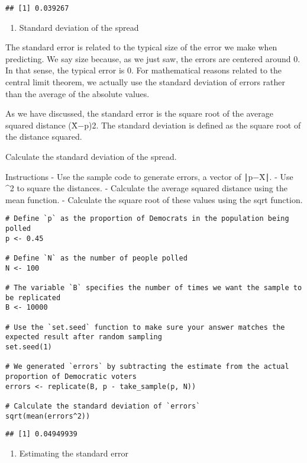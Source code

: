 \documentclass[
]{article}
\providecommand{\tightlist}{%
  \setlength{\itemsep}{0pt}\setlength{\parskip}{0pt}}
\begin{document}
\begin{verbatim}
## [1] 0.039267
\end{verbatim}

\begin{enumerate}
\def\labelenumi{\arabic{enumi}.}
\setcounter{enumi}{4}
\tightlist
\item
  Standard deviation of the spread
\end{enumerate}

The standard error is related to the typical size of the error we make
when predicting. We say size because, as we just saw, the errors are
centered around 0. In that sense, the typical error is 0. For
mathematical reasons related to the central limit theorem, we actually
use the standard deviation of errors rather than the average of the
absolute values.

As we have discussed, the standard error is the square root of the
average squared distance (X̄−p)2. The standard deviation is defined as
the square root of the distance squared.

Calculate the standard deviation of the spread.

Instructions - Use the sample code to generate errors, a vector of
∣p−X̄∣. - Use \^{}2 to square the distances. - Calculate the average
squared distance using the mean function. - Calculate the square root of
these values using the sqrt function.

\begin{verbatim}
# Define `p` as the proportion of Democrats in the population being polled
p <- 0.45

# Define `N` as the number of people polled
N <- 100

# The variable `B` specifies the number of times we want the sample to be replicated
B <- 10000

# Use the `set.seed` function to make sure your answer matches the expected result after random sampling
set.seed(1)

# We generated `errors` by subtracting the estimate from the actual proportion of Democratic voters
errors <- replicate(B, p - take_sample(p, N))

# Calculate the standard deviation of `errors`
sqrt(mean(errors^2))
\end{verbatim}

\begin{verbatim}
## [1] 0.04949939
\end{verbatim}

\begin{enumerate}
\def\labelenumi{\arabic{enumi}.}
\setcounter{enumi}{5}
\tightlist
\item
  Estimating the standard error
\end{enumerate}
\end{document}
